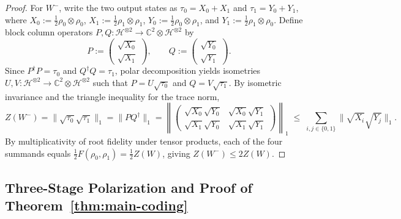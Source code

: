 \documentclass[10pt,a4paper]{article}
\numberwithin{equation}{section}
\theoremstyle{plain}
\theoremstyle{definition}
\theoremstyle{remark}
\newcommand{\cH}{\mathcal{H}}
\newcommand{\bC}{\mathbb{C}}
\begin{document}
\begin{proof}
For $W^-$, write the two output states as $\tau_0 = X_0 + X_1$ and $\tau_1 = Y_0 + Y_1$, where $X_0 := \frac{1}{2}\rho_0 \otimes \rho_0$, $X_1 := \frac{1}{2}\rho_1 \otimes \rho_1$, $Y_0 := \frac{1}{2}\rho_0 \otimes \rho_1$, and $Y_1 := \frac{1}{2}\rho_1 \otimes \rho_0$. Define block column operators $P, Q : \cH^{\otimes 2} \to \bC^2 \otimes \cH^{\otimes 2}$ by
\[
P := \begin{pmatrix} \sqrt{X_0} \\ \sqrt{X_1} \end{pmatrix}, \qquad
Q := \begin{pmatrix} \sqrt{Y_0} \\ \sqrt{Y_1} \end{pmatrix}.
\]
Since $P^{\dagger} P = \tau_0$ and $Q^{\dagger} Q = \tau_1$, polar decomposition yields isometries $U, V : \cH^{\otimes 2} \to \bC^2 \otimes \cH^{\otimes 2}$ such that $P = U\sqrt{\tau_0}$ and $Q = V\sqrt{\tau_1}$. By isometric invariance and the triangle inequality for the trace norm,
\[
Z(W^-) = \lVert \sqrt{\tau_0}\sqrt{\tau_1} \rVert_1 = \lVert P Q^{\dagger} \rVert_1 =
\left\lVert
\begin{pmatrix}
\sqrt{X_0}\sqrt{Y_0} & \sqrt{X_0}\sqrt{Y_1}\\
\sqrt{X_1}\sqrt{Y_0} & \sqrt{X_1}\sqrt{Y_1}
\end{pmatrix}
\right\rVert_1
\;\le\; \sum_{i,j \in \{0,1\}} \lVert \sqrt{X_i}\sqrt{Y_j} \rVert_1.
\]
By multiplicativity of root fidelity under tensor products, each of the four summands equals $\frac{1}{2} F(\rho_0, \rho_1) = \frac{1}{2} Z(W)$, giving $Z(W^-) \le 2 Z(W)$.
\end{proof}

\subsection{Three-Stage Polarization and Proof of Theorem~\ref{thm:main-coding}}
\end{document}
